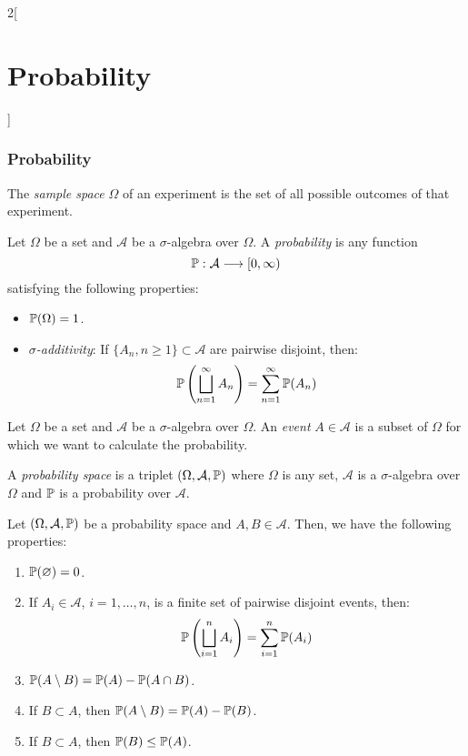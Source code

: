\documentclass[../../../main.tex]{subfiles}
\begin{document}
\begin{multicols}{2}[\section{Probability}]
  \subsubsection{Probability}
  \begin{definition}
    The \textit{sample space} $\Omega$ of an experiment is the set of all possible outcomes of that experiment.
  \end{definition}
  \begin{definition}
    Let $\Omega$ be a set and $\mathcal{A}$ be a $\sigma$-algebra over $\Omega$. A \textit{probability} is any function $$\mathbb{P}:\mathcal{A}\longrightarrow[0,\infty)$$ satisfying the following properties:
    \begin{itemize}
      \item $\mathbb{P}(\Omega)=1$.
      \item \textit{$\sigma$-additivity}: If $\{A_n,n\geq1\}\subset\mathcal{A}$ are pairwise disjoint, then: $$\mathbb{P}\left(\bigsqcup_{n=1}^\infty A_n\right)=\sum_{n=1}^\infty \mathbb{P}(A_n)$$
    \end{itemize}
  \end{definition}
  \begin{definition}
    Let $\Omega$ be a set and $\mathcal{A}$ be a $\sigma$-algebra over $\Omega$. An \textit{event} $A\in\mathcal{A}$ is a subset of $\Omega$ for which we want to calculate the probability.
  \end{definition}
  \begin{definition}
    A \textit{probability space} is a triplet $(\Omega,\mathcal{A},\mathbb{P})$ where $\Omega$ is any set, $\mathcal{A}$ is a $\sigma$-algebra over $\Omega$ and $\mathbb{P}$ is a probability over $\mathcal{A}$.
  \end{definition}
  \begin{prop}
    Let $(\Omega,\mathcal{A},\mathbb{P})$ be a probability space and $A,B\in\mathcal{A}$. Then, we have the following properties:
    \begin{enumerate}
      \item $\mathbb{P}(\varnothing)=0$.
      \item If $A_i\in\mathcal{A}$, $i=1,\ldots,n$, is a finite set of pairwise disjoint events, then: $$\mathbb{P}\left(\bigsqcup_{i=1}^n A_i\right)=\sum_{i=1}^n \mathbb{P}(A_i)$$
      \item $\mathbb{P}(A\setminus B) =\mathbb{P}(A)-\mathbb{P}(A\cap B)$.
      \item If $B\subset A$, then $\mathbb{P}(A\setminus B)=\mathbb{P}(A)-\mathbb{P}(B)$.
      \item If $B\subset A$, then $\mathbb{P}(B)\leq \mathbb{P}(A)$.

\end{enumerate}
\end{prop}
\end{multicols}
\end{document}
